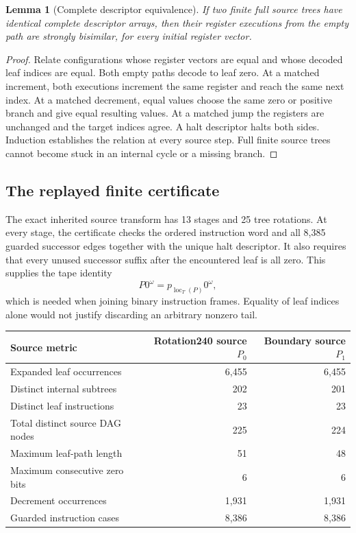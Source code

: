 \documentclass[11pt]{article}
\newtheorem{lemma}[theorem]{Lemma}
\theoremstyle{definition}\newtheorem{definition}[theorem]{Definition}
\newcommand{\loc}{\operatorname{loc}}
\begin{document}
\begin{lemma}[Complete descriptor equivalence]
If two finite full source trees have identical complete descriptor arrays,
then their register executions from the empty path are strongly bisimilar,
for every initial register vector.
\end{lemma}

\begin{proof}
Relate configurations whose register vectors are equal and whose decoded
leaf indices are equal.  Both empty paths decode to leaf zero.  At a matched
increment, both executions increment the same register and reach the same
next index.  At a matched decrement, equal values choose the same zero or
positive branch and give equal resulting values.  At a matched jump the
registers are unchanged and the target indices agree.  A halt descriptor
halts both sides.  Induction establishes the relation at every source
step.  Full finite source trees cannot become stuck in an internal cycle
or a missing branch.
\end{proof}

\subsection{The replayed finite certificate}

The exact inherited source transform has 13 stages and 25 tree rotations.
At every stage, the certificate checks the ordered instruction word and
all 8,385 guarded successor edges together with the unique halt descriptor.
It also requires that every unused successor suffix after the encountered
leaf is all zero.  This supplies the tape identity
\[
 P0^\omega=p_{\loc_T(P)}0^\omega,
 \tag{5}
\]
which is needed when joining binary instruction frames.  Equality of leaf
indices alone would not justify discarding an arbitrary nonzero tail.

\begin{center}
\begin{tabular}{lrr}
\toprule
Source metric & Rotation240 source $P_0$ & Boundary source $P_1$\\
\midrule
Expanded leaf occurrences & 6,455 & 6,455\\
Distinct internal subtrees & 202 & 201\\
Distinct leaf instructions & 23 & 23\\
Total distinct source DAG nodes & 225 & 224\\
Maximum leaf-path length & 51 & 48\\
Maximum consecutive zero bits & 6 & 6\\
Decrement occurrences & 1,931 & 1,931\\
Guarded instruction cases & 8,386 & 8,386\\
\bottomrule
\end{tabular}
\end{center}
\end{document}
